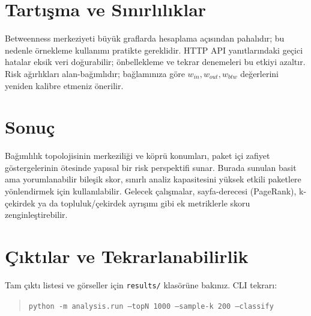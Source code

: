 \documentclass[11pt,a4paper]{article}
\begin{document}
\section{Tartışma ve Sınırlılıklar}
Betweenness merkeziyeti büyük graflarda hesaplama açısından pahalıdır; bu nedenle örnekleme kullanımı pratikte gereklidir. HTTP API yanıtlarındaki geçici hatalar eksik veri doğurabilir; önbellekleme ve tekrar denemeleri bu etkiyi azaltır. Risk ağırlıkları alan-bağımlıdır; bağlamınıza göre \(w_{in}, w_{out}, w_{btw}\) değerlerini yeniden kalibre etmeniz önerilir.

\section{Sonuç}
Bağımlılık topolojisinin merkeziliği ve köprü konumları, paket içi zafiyet göstergelerinin ötesinde yapısal bir risk perspektifi sunar. Burada sunulan basit ama yorumlanabilir bileşik skor, sınırlı analiz kapasitesini yüksek etkili paketlere yönlendirmek için kullanılabilir. Gelecek çalışmalar, sayfa-derecesi (PageRank), k-çekirdek ya da topluluk/çekirdek ayrışımı gibi ek metriklerle skoru zenginleştirebilir.

\section*{Çıktılar ve Tekrarlanabilirlik}
Tam çıktı listesi ve görseller için \texttt{results/} klasörüne bakınız. CLI tekrarı:
\begin{quote}
\texttt{python -m analysis.run --topN 1000 --sample-k 200 --classify}
\end{quote}



\end{document}
